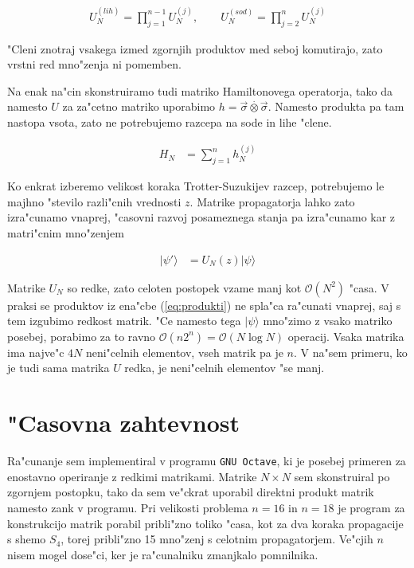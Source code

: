 \documentclass[a4paper,10pt]{article}
\begin{document}
\begin{align}
\label{eq:produkti}
 U_N^{(lih)} = \prod_{j=1}^{n-1} U_N^{(j)}, \qquad U_N^{(sod)} = \prod_{j=2}^{n} U_N^{(j)} 
\end{align}

"Cleni znotraj vsakega izmed zgornjih produktov med seboj komutirajo, zato vrstni red mno"zenja ni pomemben. 

Na enak na"cin skonstruiramo tudi matriko Hamiltonovega operatorja, tako da namesto $U$ za za"cetno matriko uporabimo $h = \vec{\sigma} \stackrel{\cdot}{\otimes} \vec{\sigma}$. 
Namesto produkta pa tam nastopa vsota, zato ne potrebujemo razcepa na sode in lihe "clene. 

\begin{align}
 H_N &= \sum_{j=1}^{n} h_N^{(j)}
\end{align}

Ko enkrat izberemo velikost koraka Trotter-Suzukijev razcep, potrebujemo le majhno "stevilo razli"cnih vrednosti $z$. 
Matrike propagatorja lahko zato izra"cunamo vnaprej, "casovni razvoj posameznega stanja pa izra"cunamo kar z matri"cnim mno"zenjem

\begin{align}
 |\psi'\rangle &= U_N(z) |\psi\rangle
\end{align}

Matrike $U_N$ so redke, zato celoten postopek vzame manj kot $\mathcal{O}(N^2)$ "casa. 
V praksi se produktov iz ena"cbe (\ref{eq:produkti}) ne spla"ca ra"cunati vnaprej, saj s tem izgubimo redkost matrik. 
"Ce namesto tega $|\psi\rangle$ mno"zimo z vsako matriko posebej, porabimo za to ravno $\mathcal{O}(n2^n) = \mathcal{O}(N\log N)$ operacij. 
Vsaka matrika ima najve"c $4N$ neni"celnih elementov, vseh matrik pa je $n$. 
V na"sem primeru, ko je tudi sama matrika $U$ redka, je neni"celnih elementov "se manj. 

\section{"Casovna zahtevnost}

Ra"cunanje sem implementiral v programu \texttt{GNU Octave}, ki je posebej primeren za enostavno operiranje z redkimi matrikami. 
Matrike $N \times N$ sem skonstruiral po zgornjem postopku, tako da sem ve"ckrat uporabil direktni produkt matrik namesto zank v programu. 
Pri velikosti problema $n=16$ in $n=18$ je program za konstrukcijo matrik porabil pribli"zno toliko "casa, kot za dva koraka propagacije s shemo $S_4$, torej pribli"zno 15 mno"zenj s celotnim propagatorjem. Ve"cjih $n$ nisem mogel dose"ci, ker je ra"cunalniku zmanjkalo pomnilnika. 
\end{document}

